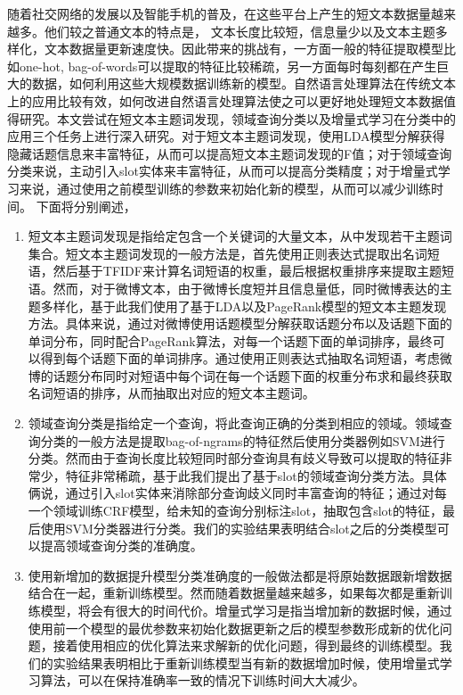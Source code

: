 \documentclass[master]{njuthesis}
\begin{document}
%
\begin{preface}

随着社交网络的发展以及智能手机的普及，在这些平台上产生的短文本数据量越来越多。他们较之普通文本的特点是，
文本长度比较短，信息量少以及文本主题多样化，文本数据量更新速度快。因此带来的挑战有，一方面一般的特征提取模型比如one-hot\cite{one-hot}, bag-of-words\cite{bag-of-words}可以提取的特征比较稀疏，另一方面每时每刻都在产生巨大的数据，如何利用这些大规模数据训练新的模型。自然语言处理算法在传统文本上的应用比较有效，如何改进自然语言处理算法使之可以更好地处理短文本数据值得研究。本文尝试在短文本主题词发现，领域查询分类以及增量式学习在分类中的应用三个任务上进行深入研究。对于短文本主题词发现，使用LDA模型分解获得隐藏话题信息来丰富特征，从而可以提高短文本主题词发现的F值；对于领域查询分类来说，主动引入slot实体来丰富特征，从而可以提高分类精度；对于增量式学习来说，通过使用之前模型训练的参数来初始化新的模型，从而可以减少训练时间。
下面将分别阐述，

\begin{enumerate}

    \item 短文本主题词发现是指给定包含一个关键词的大量文本，从中发现若干主题词集合。短文本主题词发现的一般方法是，首先使用正则表达式提取出名词短语，然后基于TFIDF来计算名词短语的权重，最后根据权重排序来提取主题短语。然而，对于微博文本，由于微博长度短并且信息量低，同时微博表达的主题多样化，基于此我们使用了基于LDA以及PageRank模型的短文本主题发现方法。具体来说，通过对微博使用话题模型分解获取话题分布以及话题下面的单词分布，同时配合PageRank算法，对每一个话题下面的单词排序，最终可以得到每个话题下面的单词排序。通过使用正则表达式抽取名词短语，考虑微博的话题分布同时对短语中每个词在每一个话题下面的权重分布求和最终获取名词短语的排序，从而抽取出对应的短文本主题词。

    \item 领域查询分类是指给定一个查询，将此查询正确的分类到相应的领域。领域查询分类的一般方法是提取bag-of-ngrams的特征然后使用分类器例如SVM进行分类。然而由于查询长度比较短同时部分查询具有歧义导致可以提取的特征非常少，特征非常稀疏，基于此我们提出了基于slot的领域查询分类方法。具体俩说，通过引入slot实体来消除部分查询歧义同时丰富查询的特征；通过对每一个领域训练CRF模型，给未知的查询分别标注slot，抽取包含slot的特征，最后使用SVM分类器进行分类。我们的实验结果表明结合slot之后的分类模型可以提高领域查询分类的准确度。

    \item 使用新增加的数据提升模型分类准确度的一般做法都是将原始数据跟新增数据结合在一起，重新训练模型。然而随着数据量越来越多，如果每次都是重新训练模型，将会有很大的时间代价。增量式学习是指当增加新的数据时候，通过使用前一个模型的最优参数来初始化数据更新之后的模型参数形成新的优化问题，接着使用相应的优化算法来求解新的优化问题，得到最终的训练模型。我们的实验结果表明相比于重新训练模型当有新的数据增加时候，使用增量式学习算法，可以在保持准确率一致的情况下训练时间大大减少。
\end{enumerate}



\end{preface}
\end{document}
